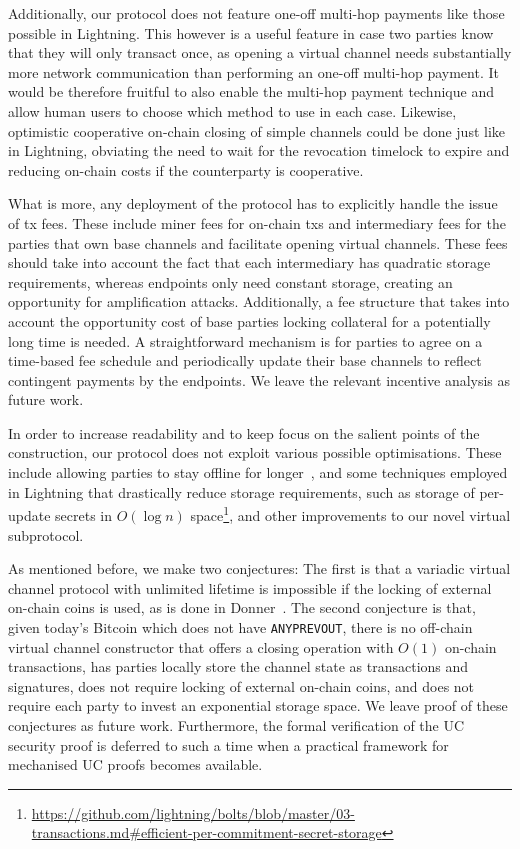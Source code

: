   Additionally, our protocol does not feature one-off multi-hop payments like
  those possible in Lightning. This however is a useful feature in case two
  parties know that they will only transact once, as opening a virtual channel
  needs substantially more network communication than performing an one-off
  multi-hop payment. It would be therefore fruitful to also enable the multi-hop
  payment technique and allow human users to choose which method to use in each
  case. Likewise, optimistic cooperative on-chain closing of simple channels
  could be done just like in Lightning, obviating the need to wait for the
  revocation timelock to expire and reducing on-chain costs if the counterparty
  is cooperative.

  What is more, any deployment of the protocol has to explicitly handle the issue
  of tx fees. These include miner fees for on-chain txs and
  intermediary fees for the parties that own base channels and facilitate
  opening virtual channels. These fees should take into account the fact that
  each intermediary has quadratic storage requirements, whereas endpoints only
  need constant storage, creating an opportunity for amplification attacks.
  Additionally, a fee structure that takes into account the opportunity cost of
  base parties locking collateral for a potentially long time is needed. A
  straightforward mechanism is for parties to agree on a time-based fee schedule
  and periodically update their base channels to reflect contingent payments by
  the endpoints. We leave the relevant incentive analysis as future work.

  In order to increase readability and to keep focus on the salient points of
  the construction, our protocol does not exploit various possible
  optimisations. These include allowing parties to stay offline for
  longer~\cite{DBLP:conf/ccs/AumayrTMMM22}, and some techniques employed in Lightning that
  drastically reduce storage requirements, such as storage of per-update secrets
  in $O(\log n)$
  space\footnote{\url{https://github.com/lightning/bolts/blob/master/03-transactions.md\#efficient-per-commitment-secret-storage}},
  and other improvements to our novel virtual subprotocol.

  As mentioned before, we make two conjectures: The first is that a variadic
  virtual channel protocol with unlimited lifetime is impossible if the locking
  of external on-chain coins is used, as is done in Donner~\cite{donner}. The
  second conjecture is that, given today's Bitcoin which does not have
  \texttt{ANYPREVOUT}, there is no off-chain virtual channel constructor that
  offers a closing operation with $O(1)$ on-chain transactions, has parties
  locally store the channel state as transactions and signatures, does not
  require locking of external on-chain coins, and does not require each party to
  invest an exponential storage space. We
  leave proof of these conjectures as future work. Furthermore, the formal verification of
  the UC security proof is deferred to such a time when a practical framework
  for mechanised UC proofs becomes available.

